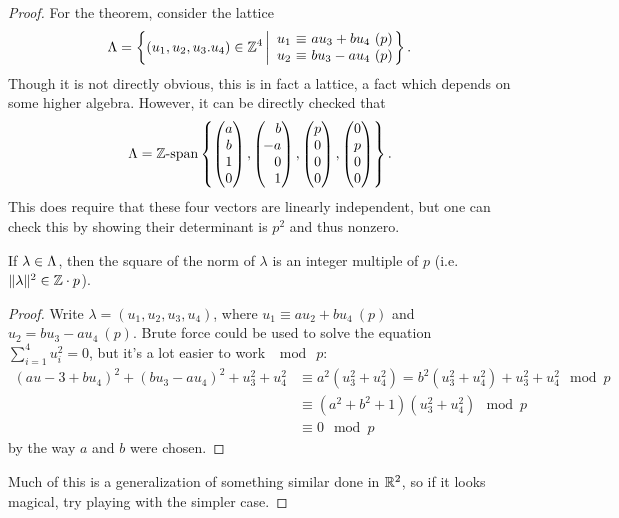 \begin{proof}
For the theorem, consider the lattice
\[
\L = \left\{(u_1,u_2,u_3.u_4)\in\Z^4 \left|
\begin{array}{r @{\ \equiv\ } l}
u_1 & au_3 +bu_4\ (p)\\
u_2 & bu_3 -au_4\ (p)
\end{array}
\right.\!\!\!\right\}.
\]
Though it is not directly obvious, this is in fact a lattice, a fact which depends on some higher algebra. However, it can be directly checked that
\[\Lambda = \operatorname{\mathbb{Z}-span}\left\{
\begin{pmatrix} a\\b\\1\\0\end{pmatrix},
\left(\!\!\!\!
\begin{array}{r}
b\\-a\\0\\1\end{array}\!\!\!
\right),
\begin{pmatrix}p\\0\\0\\0\end{pmatrix},
\begin{pmatrix}0\\p\\0\\0\end{pmatrix}
\right\}.
\]
This does require that these four vectors are linearly independent, but one can check this by showing their determinant is $p^2$ and thus nonzero.
\begin{claim}
If $\lambda\in\Lambda$, then the square of the norm of $\lambda$ is an integer multiple of $p$ (i.e. $\|\lambda\|^2 \in\mathbb{Z}\cdot p$).
\end{claim}
\begin{proof}
Write $\lambda = (u_1,u_2,u_3,u_4)$, where $u_1\equiv au_2+bu_4\ (p)$ and $u_2 = bu_3-au_4\ (p)$. Brute force could be used to solve the equation $\sum_{i=1}^4 u_i^2 = 0$, but it's a lot easier to work $\mod \ p$:
\begin{align*}
(au-3+bu_4)^2 +(bu_3-au_4)^2 +u_3^2+u_4^2 &\equiv a^2(u_3^2+u_4^2)=b^2(u_3^2+u_4^2)+u_3^2+u_4^2\mod p\\
&\equiv (a^2+b^2+1)(u_3^2+u_4^2)\mod p\\
&\equiv 0\mod p
\end{align*}
by the way $a$ and $b$ were chosen.
\end{proof}
Much of this is a generalization of something similar done in $\mathbb{R}^2$, so if it looks magical, try playing with the simpler case.


\end{proof}
